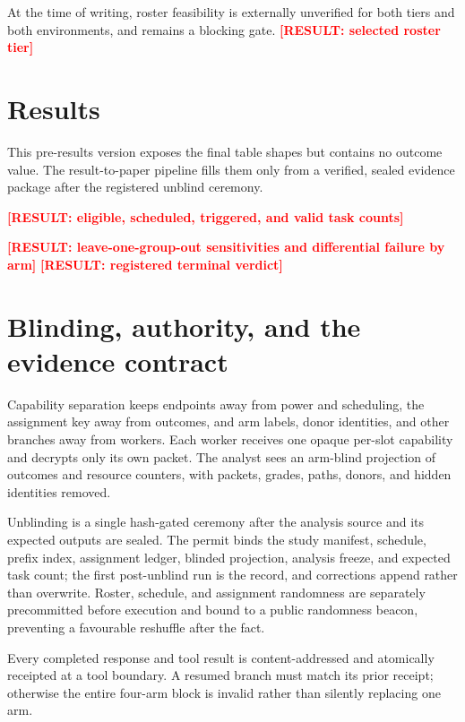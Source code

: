 \documentclass{article}
\newcommand{\result}[1]{\textcolor{red}{\textbf{[RESULT: #1]}}}
\begin{document}
At the time of writing, roster feasibility is externally unverified for both
tiers and both environments, and remains a blocking gate.
\result{selected roster tier}

\section{Results}
\label{sec:results}

This pre-results version exposes the final table shapes but contains no outcome
value. The result-to-paper pipeline fills them only from a verified, sealed
evidence package after the registered unblind ceremony.

\result{eligible, scheduled, triggered, and valid task counts}



\result{leave-one-group-out sensitivities and differential failure by arm}
\result{registered terminal verdict}

\section{Blinding, authority, and the evidence contract}
\label{sec:blinding}

Capability separation keeps endpoints away from power and scheduling, the
assignment key away from outcomes, and arm labels, donor identities, and other
branches away from workers. Each worker receives one opaque per-slot capability
and decrypts only its own packet. The analyst sees an arm-blind projection of
outcomes and resource counters, with packets, grades, paths, donors, and hidden
identities removed.

Unblinding is a single hash-gated ceremony after the analysis source and its
expected outputs are sealed. The permit binds the study manifest, schedule,
prefix index, assignment ledger, blinded projection, analysis freeze, and
expected task count; the first post-unblind run is the record, and corrections
append rather than overwrite. Roster, schedule, and assignment randomness are
separately precommitted before execution and bound to a public randomness
beacon, preventing a favourable reshuffle after the fact.

Every completed response and tool result is content-addressed and atomically
receipted at a tool boundary. A resumed branch must match its prior receipt;
otherwise the entire four-arm block is invalid rather than silently replacing
one arm.
\end{document}

